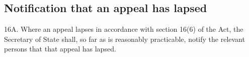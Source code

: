\documentclass[a4paper,12pt]{article}
\begin{document}
\subsection[16A. Notification that an appeal has lapsed]{Notification that an appeal has lapsed}

16A.  Where an appeal lapses in accordance with section 16(6) of the Act, the Secretary of State shall, so far as is reasonably practicable, notify the relevant persons that that appeal has lapsed.


%
%
%
%
%
\end{document}
